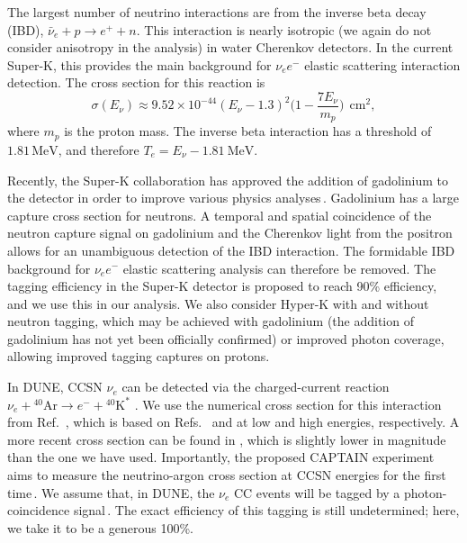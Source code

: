 \documentclass[aps,reprint,superscriptaddress]{revtex4-1}
\begin{document}
The largest number of neutrino interactions are from the inverse beta decay (IBD), $\bar{\nu}_{e}+p\rightarrow e^{+}+n$.  This interaction is nearly isotropic (we again do not consider anisotropy in the analysis) in water Cherenkov detectors. In the current Super-K, this provides the main background for $\nu_{e} e^-$ elastic scattering interaction detection.  The cross section for this reaction is \cite{Vogel:1999zy,Strumia:2003zx}
\begin{equation} \label{eq:crossSecIB}
\sigma(E_{\nu})\approx9.52\times10^{-44}(E_{\nu}-1.3)^{2}\bigg(1-\frac{7E_{\nu}}{m_{p}}\bigg)\:\:\text{cm}^{2},
\end{equation}
where $m_{p}$ is the proton mass. The inverse beta interaction has a threshold of $1.81\,\text{MeV}$, and therefore $T_{e}=E_{\nu}-1.81\:\text{MeV}$.

Recently, the Super-K collaboration has approved the addition of gadolinium to the detector in order to improve various physics analyses\,\cite{Beacom:2003nk}.  Gadolinium has a large capture cross section for neutrons.  A temporal and spatial coincidence of the neutron capture signal on gadolinium and the Cherenkov light from the positron allows for an unambiguous detection of the IBD interaction.  The formidable IBD background for $\nu_{e} e^-$ elastic scattering analysis can therefore be removed.  The tagging efficiency in the Super-K detector is proposed to reach 90\% efficiency, and we use this in our analysis.  We also consider Hyper-K with and without neutron tagging, which may be achieved with gadolinium (the addition of gadolinium has not yet been officially confirmed) or improved photon coverage, allowing improved tagging captures on protons. 

In DUNE, CCSN $\nu_e$ can be detected via the charged-current reaction $\nu_{e}+{}^{40}\text{Ar}\rightarrow e^{-}+{}^{40}\text{K}^{*}$ \cite{Bueno:2003ei,GilBotella:2003sz,Chauhan:2017tgf}. We use the numerical cross section for this interaction from Ref.~\cite{Cocco:2004ac}, which is based on Refs.~\cite{Ormand:1994js} and \cite{Kolbe:2003ys} at low and high energies, respectively.  A more recent cross section can be found in \cite{Chauhan:2017tgf}, which is slightly lower in magnitude than the one we have used.  Importantly, the proposed CAPTAIN experiment aims to measure the neutrino-argon cross section at CCSN energies for the first time\,\cite{McGrew,Whitehead}. We assume that, in DUNE, the $\nu_e$ CC events will be tagged by a photon-coincidence signal\,\cite{Ankowski:2016lab}.  The exact efficiency of this tagging is still undetermined; here, we take it to be a generous 100\%. 
\end{document}
